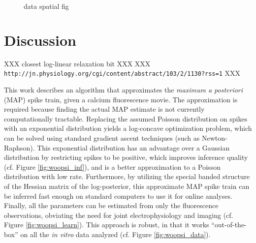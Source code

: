 \begin{figure}[h!]
\caption{data spatial fig} \label{fig:spatial_learn_multi_data}
\end{figure}





\section{Discussion} \label{sec:dis}


XXX closest log-linear relaxation bit XXX
XXX \texttt{http://jn.physiology.org/cgi/content/abstract/103/2/1130?rss=1} XXX



This work describes an algorithm that approximates the \emph{maximum a posteriori} (MAP) spike train, given a calcium fluorescence movie.  The approximation is required because finding the actual MAP estimate is not currently computationally tractable.  Replacing the assumed Poisson distribution on spikes with an exponential distribution yields a log-concave optimization problem, which can be solved using standard gradient ascent techniques (such as Newton-Raphson).  This exponential distribution has an advantage over a Gaussian distribution by restricting spikes to be positive, which improves inference quality (cf. Figure \ref{fig:woopsi_inf}), and is a better approximation to a Poisson distribution with low rate.  %
Furthermore, by utilizing the special banded structure of the Hessian matrix of the log-posterior, this approximate MAP spike train can be inferred fast enough on standard computers to use it for online analyses.  Finally, all the parameters can be estimated from only the fluorescence observations, obviating the need for joint electrophysiology and imaging (cf. Figure \ref{fig:woopsi_learn}).  This approach is robust, in that it works ``out-of-the-box'' on all the \emph{in vitro} data analyzed (cf. Figure \ref{fig:woopsi_data}).

